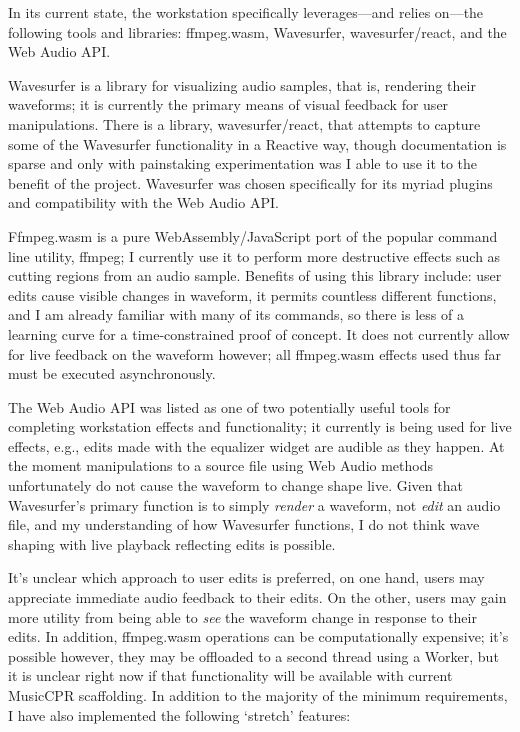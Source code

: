 \documentclass[manuscript,screen,review]{acmart}
\begin{document}
In its current state, the workstation specifically leverages---and relies on---the following tools and libraries: ffmpeg.wasm, Wavesurfer, wavesurfer/react, and the Web Audio API.

Wavesurfer is a library for visualizing audio samples, that is, rendering their waveforms; it is currently the primary means of visual feedback for user manipulations.
There is a library, wavesurfer/react, that attempts to capture some of the Wavesurfer functionality in a Reactive way, though documentation is sparse and only with painstaking experimentation was I able to use it to the benefit of the project.
Wavesurfer was chosen specifically for its myriad plugins and compatibility with the Web Audio API.

Ffmpeg.wasm is a pure WebAssembly/JavaScript port of the popular command line utility, ffmpeg; I currently use it to perform more destructive effects such as cutting regions from an audio sample.
Benefits of using this library include: user edits cause visible changes in waveform, it permits countless different functions, and I am already familiar with many of its commands, so there is less of a learning curve for a time-constrained proof of concept.
It does not currently allow for live feedback on the waveform however; all ffmpeg.wasm effects used thus far must be executed asynchronously.

The Web Audio API was listed as one of two potentially useful tools for completing workstation effects and functionality; it currently is being used for live effects, e.g., edits made with the equalizer widget are audible as they happen.
At the moment manipulations to a source file using Web Audio methods unfortunately do not cause the waveform to change shape live.
Given that Wavesurfer's primary function is to simply \textit{render} a waveform, not \textit{edit} an audio file, and my understanding of how Wavesurfer functions, I do not think wave shaping with live playback reflecting edits is possible. 

It's unclear which approach to user edits is preferred, on one hand, users may appreciate immediate audio feedback to their edits.
On the other, users may gain more utility from being able to \textit{see} the waveform change in response to their edits.
In addition, ffmpeg.wasm operations can be computationally expensive; it's possible however, they may be offloaded to a second thread using a Worker, but it is unclear right now if that functionality will be available with current MusicCPR scaffolding.
In addition to the majority of the minimum requirements, I have also implemented the following `stretch' features:
\end{document}
